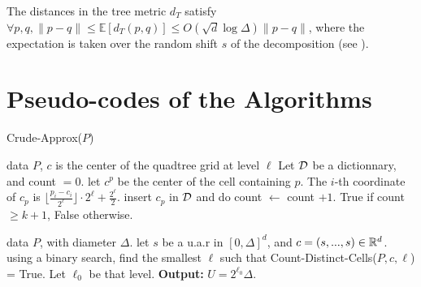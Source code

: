 The distances in the tree metric $d_T$ satisfy
$\forall p,q, \|p-q\| \leq \mathbb{E}[d_T(p, q)] \leq O(\sqrt{d} \log \Delta) \|p-q\|$, where the expectation is taken over the random shift $s$ of the decomposition (see \cite{}).

\section{Pseudo-codes of the Algorithms}
\label{app:pseudoCode}
\begin{algorithm}[tb]
   \caption{Crude-Approx($P$)}
   \label{alg:crudeApx}
\begin{algorithmic}[1]
 \Comment data $P$, $c$ is the center of the quadtree grid at level $\ell$
   \State Let $\mathcal D$ be a dictionnary, and count $= 0$.
   \State let $c^p$ be the center of the cell containing $p$. The $i$-th coordinate of $c_p$ is $\lfloor \frac{p_i - c_i}{2^\ell}\rfloor  \cdot 2^\ell + \frac{2^{\ell}}{2}$. 
   \State insert $c_p$ in $\mathcal D$ and do count $\gets$ count $+1$.
   \EndIf
   \EndFor
    True if count $\geq k+1$, False otherwise.
   \EndProcedure
   
    \Comment data $P$, with diameter $\Delta$.
   \State let $s$ be a u.a.r in $[0, \Delta]^d$, and $c = (s,..., s) \in \mathbb{R}^d$.
   \State using a binary search, find the smallest $\ell$ such that Count-Distinct-Cells($P, c, \ell$) = True. Let $\ell_0$ be that level.
   \State \textbf{Output:} $U = 2^{\ell_0} \Delta$.
   \EndProcedure
\end{algorithmic}
\end{algorithm}

